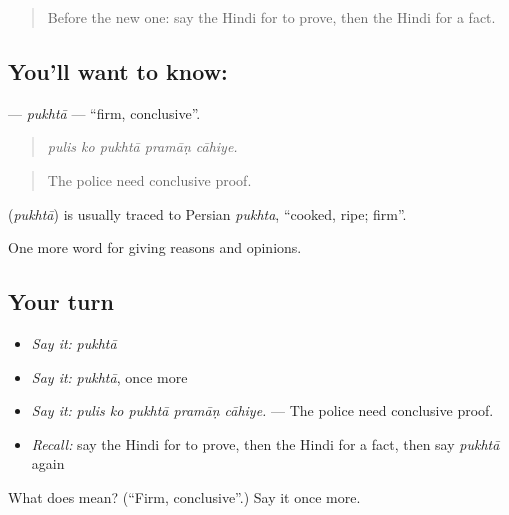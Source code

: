 \label{lesson:HI-C348-pukhta}



\begin{quote}
Before the new one: say the Hindi for to prove, then the Hindi for a fact.
\end{quote}

\subsection*{You'll want to know: }
\textbf{} — \emph{pukhtā} — \textquotedblleft{}firm, conclusive\textquotedblright{}.

\begin{quote}
    
\end{quote}

\begin{quote}
\emph{pulis ko pukhtā pramāṇ cāhiye.}
\end{quote}

\begin{quote}
The police need conclusive proof.
\end{quote}

\begin{cousinweb}
\textbf{} (\emph{pukhtā}) is usually traced to Persian \emph{pukhta}, \textquotedblleft{}cooked, ripe; firm\textquotedblright{}.
\end{cousinweb}

\begin{grammarlens}[title={What you've built}]
One more word for giving reasons and opinions.
\end{grammarlens}

\subsection*{Your turn}
\begin{itemize}
\raggedright
  \item \emph{Say it:} \emph{pukhtā}
  \item \emph{Say it:} \emph{pukhtā}, once more
  \item \emph{Say it:} \emph{pulis ko pukhtā pramāṇ cāhiye.} — The police need conclusive proof.
  \item \emph{Recall:} say the Hindi for to prove, then the Hindi for a fact, then say \emph{pukhtā} again
\end{itemize}

\begin{tcolorbox}[breakable,colback=teal!4,colframe=teal!35!black,title={Before you move on}]
What does  mean? (\textquotedblleft{}Firm, conclusive\textquotedblright{}.) Say it once more.
\end{tcolorbox}
